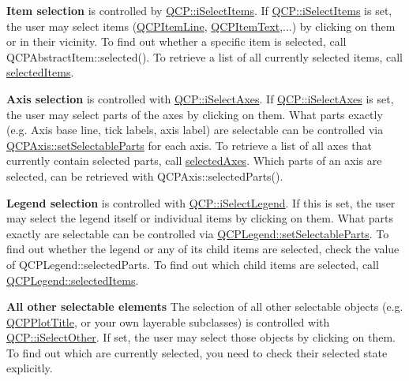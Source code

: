 {\bfseries Item selection} is controlled by \hyperlink{namespace_q_c_p_a2ad6bb6281c7c2d593d4277b44c2b037aea2f7c105d674e76d9b187b02ef29260}{Q\+C\+P\+::i\+Select\+Items}. If \hyperlink{namespace_q_c_p_a2ad6bb6281c7c2d593d4277b44c2b037aea2f7c105d674e76d9b187b02ef29260}{Q\+C\+P\+::i\+Select\+Items} is set, the user may select items (\hyperlink{class_q_c_p_item_line}{Q\+C\+P\+Item\+Line}, \hyperlink{class_q_c_p_item_text}{Q\+C\+P\+Item\+Text},...) by clicking on them or in their vicinity. To find out whether a specific item is selected, call Q\+C\+P\+Abstract\+Item\+::selected(). To retrieve a list of all currently selected items, call \hyperlink{class_q_custom_plot_afda487bcf2d6cf1a57173d82495e29ba}{selected\+Items}.

{\bfseries Axis selection} is controlled with \hyperlink{namespace_q_c_p_a2ad6bb6281c7c2d593d4277b44c2b037ad6644ac55bef621645326e9dd7469caa}{Q\+C\+P\+::i\+Select\+Axes}. If \hyperlink{namespace_q_c_p_a2ad6bb6281c7c2d593d4277b44c2b037ad6644ac55bef621645326e9dd7469caa}{Q\+C\+P\+::i\+Select\+Axes} is set, the user may select parts of the axes by clicking on them. What parts exactly (e.\+g. Axis base line, tick labels, axis label) are selectable can be controlled via \hyperlink{class_q_c_p_axis_a513f9b9e326c505d9bec54880031b085}{Q\+C\+P\+Axis\+::set\+Selectable\+Parts} for each axis. To retrieve a list of all axes that currently contain selected parts, call \hyperlink{class_q_custom_plot_a7e6b07792b1cb2c31681596582d14dbe}{selected\+Axes}. Which parts of an axis are selected, can be retrieved with Q\+C\+P\+Axis\+::selected\+Parts().

{\bfseries Legend selection} is controlled with \hyperlink{namespace_q_c_p_a2ad6bb6281c7c2d593d4277b44c2b037a269c9af298e257d1108edec0432b5513}{Q\+C\+P\+::i\+Select\+Legend}. If this is set, the user may select the legend itself or individual items by clicking on them. What parts exactly are selectable can be controlled via \hyperlink{class_q_c_p_legend_a9ce60aa8bbd89f62ae4fa83ac6c60110}{Q\+C\+P\+Legend\+::set\+Selectable\+Parts}. To find out whether the legend or any of its child items are selected, check the value of Q\+C\+P\+Legend\+::selected\+Parts. To find out which child items are selected, call \hyperlink{class_q_c_p_legend_ac7d9e567d5c551e09cd9bcc4306c5532}{Q\+C\+P\+Legend\+::selected\+Items}.

{\bfseries All other selectable elements} The selection of all other selectable objects (e.\+g. \hyperlink{class_q_c_p_plot_title}{Q\+C\+P\+Plot\+Title}, or your own layerable subclasses) is controlled with \hyperlink{namespace_q_c_p_a2ad6bb6281c7c2d593d4277b44c2b037af67a50bc26147a13b551b3a625374949}{Q\+C\+P\+::i\+Select\+Other}. If set, the user may select those objects by clicking on them. To find out which are currently selected, you need to check their selected state explicitly.

